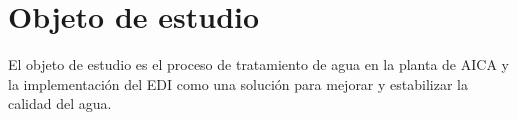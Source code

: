 \section{Objeto de estudio}
El objeto de estudio es el proceso de tratamiento de agua en la planta de AICA y la implementación del EDI como una solución para mejorar y estabilizar la calidad del agua.